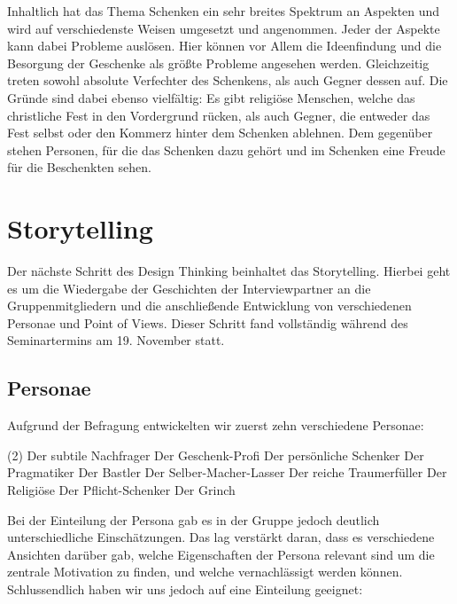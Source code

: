 \documentclass[12pt,ngerman, fleqn]{book} %
\begin{document}
Inhaltlich hat das Thema Schenken ein sehr breites Spektrum an Aspekten und wird auf verschiedenste Weisen umgesetzt und angenommen. Jeder der Aspekte kann dabei Probleme auslösen. Hier können vor Allem die Ideenfindung und die Besorgung der Geschenke als größte Probleme angesehen werden. Gleichzeitig treten sowohl absolute Verfechter des Schenkens, als auch Gegner dessen auf. Die Gründe sind dabei ebenso vielfältig: Es gibt religiöse Menschen, welche das christliche Fest in den Vordergrund rücken, als auch Gegner, die entweder das Fest selbst oder den Kommerz hinter dem Schenken ablehnen. Dem gegenüber stehen Personen, für die das Schenken dazu gehört und im Schenken eine Freude für die Beschenkten sehen.

\chapter{Storytelling}
\setcounter{page}{7}

Der nächste Schritt des Design Thinking beinhaltet das Storytelling. Hierbei geht es um die Wiedergabe der Geschichten der Interviewpartner an die Gruppenmitgliedern und die anschließende Entwicklung von verschiedenen Personae und Point of Views. Dieser Schritt fand vollständig während des Seminartermins am 19. November statt.

\section{Personae}
Aufgrund der Befragung entwickelten wir zuerst zehn verschiedene Personae:

\begin{tasks}(2)
    \task Der subtile Nachfrager
    \task Der Geschenk-Profi
    \task Der persönliche Schenker
    \task Der Pragmatiker
    \task Der Bastler
    \task Der Selber-Macher-Lasser
    \task Der reiche Traumerfüller
    \task Der Religiöse
    \task Der Pflicht-Schenker
    \task Der Grinch
\end{tasks}

Bei der Einteilung der Persona gab es in der Gruppe jedoch deutlich unterschiedliche Einschätzungen. Das lag verstärkt daran, dass es verschiedene Ansichten darüber gab, welche Eigenschaften der Persona relevant sind um die zentrale Motivation zu finden, und welche vernachlässigt werden können. Schlussendlich haben wir uns jedoch auf eine Einteilung geeignet:
\end{document}
